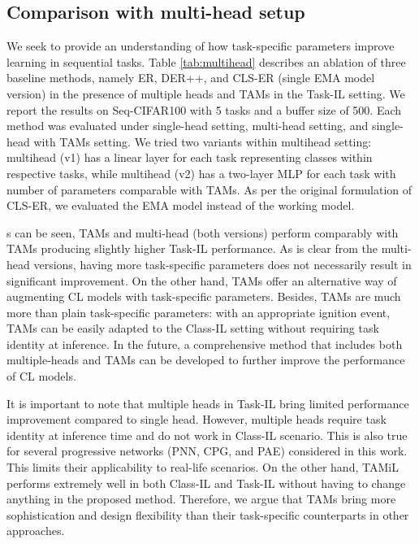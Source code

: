 \documentclass{article} %
\begin{document}
\subsection{Comparison with multi-head setup}
 We seek to provide an understanding of how task-specific parameters improve learning in sequential tasks. Table \ref{tab:multihead} describes an ablation of three baseline methods, namely ER, DER++, and CLS-ER (single EMA model version) in the presence of multiple heads and TAMs in the Task-IL setting. We report the results on Seq-CIFAR100 with 5 tasks and a buffer size of 500. Each method was evaluated under single-head setting, multi-head setting, and single-head with TAMs setting. We tried two variants within multihead setting: multihead (v1) has a linear layer for each task representing classes within respective tasks, while multihead (v2) has a two-layer MLP for each task with number of parameters comparable with TAMs. As per the original formulation of CLS-ER, we evaluated the EMA model instead of the working model. 

 s can be seen, TAMs and multi-head (both versions) perform comparably with TAMs producing slightly higher Task-IL performance. As is clear from the multi-head versions, having more task-specific parameters does not necessarily result in significant improvement. On the other hand, TAMs offer an alternative way of augmenting CL models with task-specific parameters. Besides, TAMs are much more than plain task-specific parameters: with an appropriate ignition event, TAMs can be easily adapted to the Class-IL setting without requiring task identity at inference.   In the future, a comprehensive method that includes both multiple-heads and TAMs can be developed to further improve the performance of CL models. 

 It is important to note that multiple heads in Task-IL bring limited performance improvement compared to single head. However, multiple heads require task identity at inference time and do not work in Class-IL scenario. This is also true for several progressive networks (PNN, CPG, and PAE) considered in this work. This limits their applicability to real-life scenarios. On the other hand, TAMiL performs extremely well in both Class-IL and Task-IL without having to change anything in the proposed method. Therefore, we argue that TAMs bring more sophistication and design flexibility than their task-specific counterparts in other approaches.
 
\end{document}
